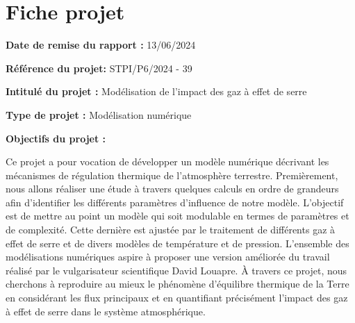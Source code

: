 \documentclass[a4paper, 12pt]{report} %
\begin{document}

\newpage
{}
\setcounter{page}{1}
\thispagestyle{empty}
\null


\newpage
\pagestyle{special}

\chapter*{Fiche projet} %

\textbf{Date de remise du rapport :} 13/06/2024 \vspace{\baselineskip}

\textbf{Référence du projet:} STPI/P6/2024 - 39 \vspace{\baselineskip}

\textbf{Intitulé du projet :} Modélisation de l'impact des gaz à effet de serre \vspace{\baselineskip}

\textbf{Type de projet :} Modélisation numérique \vspace{\baselineskip}

\textbf{Objectifs du projet :} \vspace{\baselineskip} 

Ce projet a pour vocation de développer un modèle numérique
décrivant les mécanismes de régulation thermique de 
l'atmosphère terrestre. Premièrement, nous allons réaliser
une étude à travers quelques calculs en ordre de grandeurs afin
d'identifier les différents paramètres d'influence de notre modèle.
L'objectif est de mettre au point un modèle qui soit modulable
en termes de paramètres et de complexité. Cette dernière est 
ajustée par le traitement de différents gaz à effet de serre 
et de divers modèles de température et de pression. 
L'ensemble des modélisations numériques aspire à proposer 
une version améliorée du travail réalisé par le 
vulgarisateur scientifique David Louapre. À travers ce projet, 
nous cherchons à reproduire au mieux le 
phénomène d'équilibre thermique de la Terre en considérant 
les flux principaux et en quantifiant précisément l'impact
des gaz à effet de serre dans le système atmosphérique. \vspace{\baselineskip}
\end{document}
